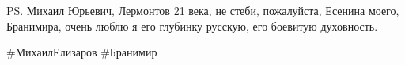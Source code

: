 PS. Михаил Юрьевич, Лермонтов 21 века, не стеби, пожалуйста, Есенина моего,
Бранимира, очень люблю я его глубинку русскую, его боевитую духовность.

\#МихаилЕлизаров \#Бранимир


